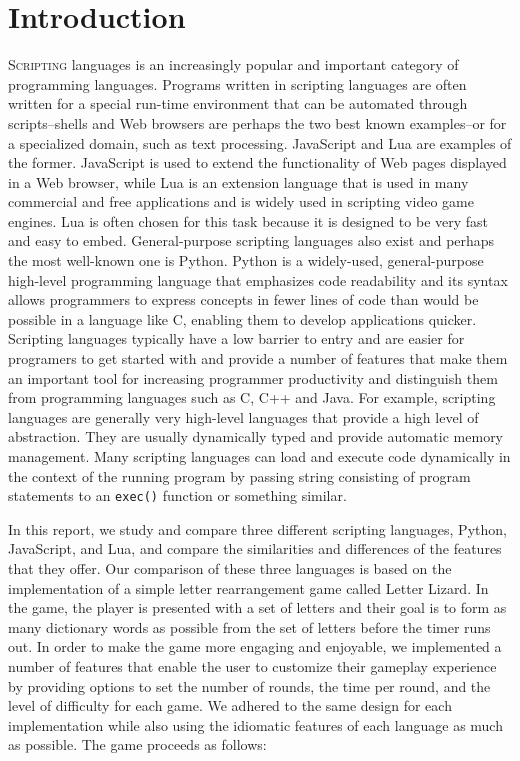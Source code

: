 \section{Introduction}

\lettrine[nindent=0em,lines=3]{S}{cripting} languages is an increasingly popular and important
category of programming languages. Programs written in scripting languages are often written for
a special run-time environment that can be automated through scripts--shells and Web browsers
are perhaps the two best known examples--or for a specialized domain, such as text processing.
JavaScript and Lua are examples of the former. JavaScript is used to extend the functionality
of Web pages displayed in a Web browser, while Lua is an extension language that is used in many 
commercial and free applications and is widely used in scripting video game engines. Lua is
often chosen for this task because it is designed to be very fast and easy to embed.
General-purpose scripting languages also exist and perhaps the most well-known one is Python.
Python is a widely-used, general-purpose high-level programming language that emphasizes code
readability and its syntax allows programmers to express concepts in fewer lines of code than would be 
possible in a language like C, enabling them to develop applications quicker. 
Scripting languages typically have a low barrier to entry and are easier for programers to 
get started with and provide a number of features that make them an important tool for increasing 
programmer productivity and distinguish them from programming languages such as C, C++ and Java. 
For example, scripting languages are generally very high-level languages that provide a high level of 
abstraction. They are usually dynamically typed and provide automatic memory management. Many
scripting languages can load and execute code dynamically in the context of the running program
by passing string consisting of program statements to an \texttt{exec()} function or something
similar.

In this report, we study and compare three different scripting languages, Python,
JavaScript, and Lua, and compare the similarities and differences of the features that
they offer. Our comparison of these three languages
is based on the implementation of a simple letter rearrangement game
called Letter Lizard. In the game, the player is presented with a set of letters and 
their goal is to form as many dictionary words as possible from the set of letters
before the timer runs out. In order to make the game
more engaging and enjoyable, we implemented a number of features that enable the user to customize
their gameplay experience by providing options to set the number of rounds, the time per round, 
and the level of difficulty for each
game.
We adhered to the same
design for each implementation while also using the idiomatic features of each language as much as 
possible. The game proceeds as follows:

